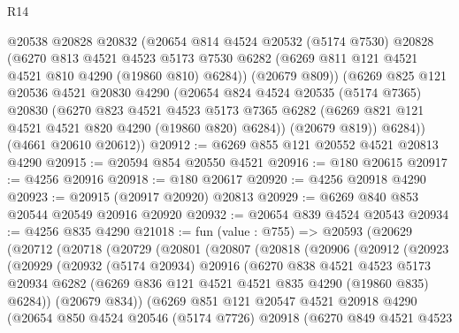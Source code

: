\begin{lexlean}{R14}
\begin{coremodule}
        @20538
        @20828
        @20832
        (@20654
          @814
          @4524
          @20532
          (@5174 @7530)
          @20828
          (@6270
            @813
            @4521
            @4523
            @5173
            @7530
            @6282
            (@6269 @811 @121 @4521 @4521 @810 @4290 (@19860 @810) @6284))
          (@20679 @809))
        (@6269
          @825
          @121
          @20536
          @4521
          @20830
          @4290
          (@20654
            @824
            @4524
            @20535
            (@5174 @7365)
            @20830
            (@6270
              @823
              @4521
              @4523
              @5173
              @7365
              @6282
              (@6269 @821 @121 @4521 @4521 @820 @4290 (@19860 @820) @6284))
            (@20679 @819))
          @6284))
      (@4661 @20610 @20612))
@20912 := @6269 @855 @121 @20552 @4521 @20813 @4290
@20915 := @20594 @854 @20550 @4521
@20916 := @180 @20615
@20917 := @4256 @20916
@20918 := @180 @20617
@20920 := @4256 @20918 @4290
@20923 := @20915 (@20917 @20920) @20813
@20929 := @6269 @840 @853 @20544 @20549 @20916 @20920
@20932 := @20654 @839 @4524 @20543
@20934 := @4256 @835 @4290
@21018 := fun (value : @755) =>
  @20593
    (@20629
      (@20712
        (@20718
          (@20729
            (@20801
              (@20807
                (@20818
                  (@20906
                    (@20912
                      (@20923
                        (@20929
                          (@20932
                            (@5174 @20934)
                            @20916
                            (@6270
                              @838
                              @4521
                              @4523
                              @5173
                              @20934
                              @6282
                              (@6269 @836 @121 @4521 @4521 @835 @4290 (@19860 @835) @6284))
                            (@20679 @834))
                          (@6269
                            @851
                            @121
                            @20547
                            @4521
                            @20918
                            @4290
                            (@20654
                              @850
                              @4524
                              @20546
                              (@5174 @7726)
                              @20918
                              (@6270
                                @849
                                @4521
                                @4523

\end{coremodule}
\end{lexlean}
